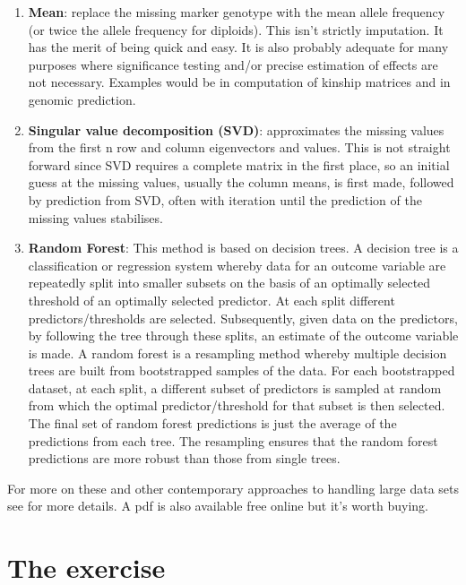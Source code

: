 \documentclass[
]{book}
\begin{document}
\begin{enumerate}
\def\labelenumi{\arabic{enumi}.}
\item
  \textbf{Mean}: replace the missing marker genotype with the mean allele frequency (or twice the allele frequency for diploids). This isn't strictly imputation. It has the merit of being quick and easy. It is also probably adequate for many purposes where significance testing and/or precise estimation of effects are not necessary. Examples would be in computation of kinship matrices and in genomic prediction.
\item
  \textbf{Singular value decomposition (SVD)}: approximates the missing values from the first n row and column eigenvectors and values. This is not straight forward since SVD requires a complete matrix in the first place, so an initial guess at the missing values, usually the column means, is first made, followed by prediction from SVD, often with iteration until the prediction of the missing values stabilises.
\item
  \textbf{Random Forest}: This method is based on decision trees. A decision tree is a classification or regression system whereby data for an outcome variable are repeatedly split into smaller subsets on the basis of an optimally selected threshold of an optimally selected predictor. At each split different predictors/thresholds are selected. Subsequently, given data on the predictors, by following the tree through these splits, an estimate of the outcome variable is made. A random forest is a resampling method whereby multiple decision trees are built from bootstrapped samples of the data. For each bootstrapped dataset, at each split, a different subset of predictors is sampled at random from which the optimal predictor/threshold for that subset is then selected. The final set of random forest predictions is just the average of the predictions from each tree. The resampling ensures that the random forest predictions are more robust than those from single trees.
\end{enumerate}

For more on these and other contemporary approaches to handling large data sets see \citet{james_2013} for more details. A pdf is also available free online but it's worth buying.

\hypertarget{the-exercise-1}{%
\section{The exercise}\label{the-exercise-1}}
\end{document}
